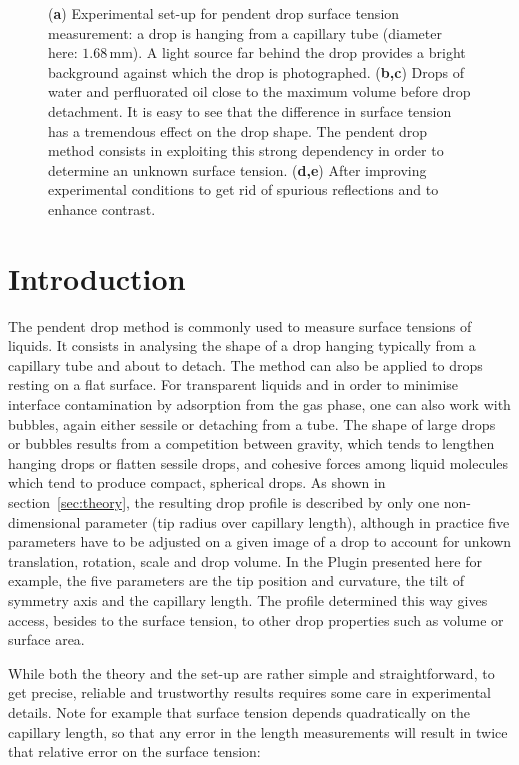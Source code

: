 \documentclass[fleqn]{scrartcl}
\newcommand{\subfig}[1]{\textbf{\textsf{#1}}}
\begin{document}
\begin{figure}
  \caption{(\subfig{a}) Experimental set-up for pendent drop surface
    tension measurement: a drop is hanging from a capillary tube
    (diameter here: $1.68\,$mm). A light source far behind the drop
    provides a bright background against which the drop is
    photographed. (\subfig{b,c}) Drops of water and perfluorated oil
    close to the maximum volume before drop detachment. It is easy to
    see that the difference in surface tension has a tremendous effect
    on the drop shape. The pendent drop method consists in exploiting
    this strong dependency in order to determine an unknown surface
    tension. (\subfig{d,e}) After improving experimental conditions to
    get rid of spurious reflections and to enhance contrast.}
  \label{fig:pendentdropphoto}
\end{figure}


\section{Introduction}
\label{sec:introduction}

The pendent drop method is commonly used to measure surface tensions
of liquids. It consists in analysing the shape of a drop hanging
typically from a capillary tube and about to detach. The method can
also be applied to drops resting on a flat surface. For transparent
liquids and in order to minimise interface contamination by adsorption
from the gas phase, one can also work with bubbles, again either
sessile or detaching from a tube. The shape of large drops or bubbles
results from a competition between gravity, which tends to lengthen
hanging drops or flatten sessile drops, and cohesive forces among
liquid molecules which tend to produce compact, spherical drops. As
shown in section~\ref{sec:theory}, the resulting drop profile
is described by only one non-dimensional parameter (tip radius over
capillary length), although in practice five parameters have to be
adjusted on a given image of a drop to account for unkown translation,
rotation, scale and drop volume. In the Plugin presented here for
example, the five parameters are the tip position and curvature, the
tilt of symmetry axis and the capillary length. The profile determined
this way gives access, besides to the surface tension, to other drop
properties such as volume or surface area.

While both the theory and the set-up are rather simple and
straightforward, to get precise, reliable and trustworthy results
requires some care in experimental details. Note for example that
surface tension depends quadratically on the capillary length, so that
any error in the length measurements will result in twice that
relative error on the surface tension:
\end{document}
